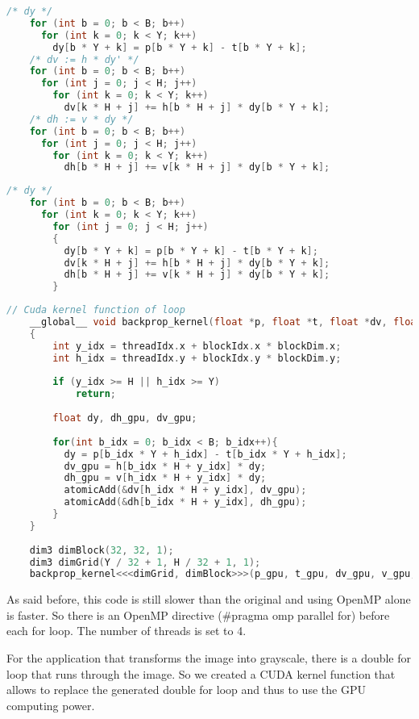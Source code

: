\documentclass[11pt]{article}
\begin{document}
\begin{lstlisting}[language=C, caption="Original code with triple loop"]
	/* dy */
	for (int b = 0; b < B; b++)
	  for (int k = 0; k < Y; k++)
		dy[b * Y + k] = p[b * Y + k] - t[b * Y + k];
	/* dv := h * dy' */
	for (int b = 0; b < B; b++)
	  for (int j = 0; j < H; j++)
		for (int k = 0; k < Y; k++)
		  dv[k * H + j] += h[b * H + j] * dy[b * Y + k];
	/* dh := v * dy */
	for (int b = 0; b < B; b++)
	  for (int j = 0; j < H; j++)
		for (int k = 0; k < Y; k++)
		  dh[b * H + j] += v[k * H + j] * dy[b * Y + k];
\end{lstlisting}


\begin{lstlisting}[language=C, caption="Edited nested triple loop"]
	/* dy */
	for (int b = 0; b < B; b++)
	  for (int k = 0; k < Y; k++)
		for (int j = 0; j < H; j++)
		{
		  dy[b * Y + k] = p[b * Y + k] - t[b * Y + k];
		  dv[k * H + j] += h[b * H + j] * dy[b * Y + k];
		  dh[b * H + j] += v[k * H + j] * dy[b * Y + k];
		}
\end{lstlisting}

\begin{lstlisting}[language=C, caption="CUDA kernel function to calculate back\_propagation"]
	// Cuda kernel function of loop
	__global__ void backprop_kernel(float *p, float *t, float *dv, float *v, float *dh, float *h)
	{
		int y_idx = threadIdx.x + blockIdx.x * blockDim.x;
		int h_idx = threadIdx.y + blockIdx.y * blockDim.y;
	
		if (y_idx >= H || h_idx >= Y)
			return;
	
		float dy, dh_gpu, dv_gpu;
	
		for(int b_idx = 0; b_idx < B; b_idx++){
		  dy = p[b_idx * Y + h_idx] - t[b_idx * Y + h_idx];
		  dv_gpu = h[b_idx * H + y_idx] * dy;
		  dh_gpu = v[h_idx * H + y_idx] * dy;
		  atomicAdd(&dv[h_idx * H + y_idx], dv_gpu);
		  atomicAdd(&dh[b_idx * H + y_idx], dh_gpu);
		}
	}
	
	dim3 dimBlock(32, 32, 1);
	dim3 dimGrid(Y / 32 + 1, H / 32 + 1, 1);
	backprop_kernel<<<dimGrid, dimBlock>>>(p_gpu, t_gpu, dv_gpu, v_gpu, dh_gpu, h_gpu);
\end{lstlisting}

As said before, this code is still slower than the original and using OpenMP alone is faster.
So there is an OpenMP directive (\#pragma omp parallel for) before each for loop.
The number of threads is set to 4.

For the application that transforms the image into grayscale, there is a double for loop that runs through the image.
So we created a CUDA kernel function that allows to replace the generated double for loop and thus to use the GPU computing power.
\end{document}
